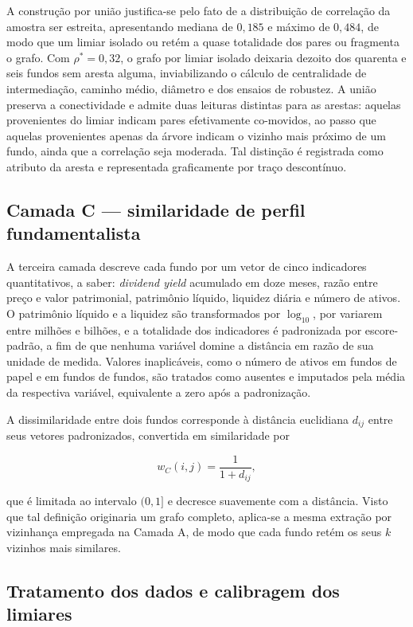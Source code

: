A construção por união justifica-se pelo fato de a distribuição de correlação
da amostra ser estreita, apresentando mediana de $0{,}185$ e máximo de
$0{,}484$, de modo que um limiar isolado ou retém a quase totalidade dos pares
ou fragmenta o grafo. Com $\rho^{*} = 0{,}32$, o grafo por limiar isolado
deixaria dezoito dos quarenta e seis fundos sem aresta alguma, inviabilizando
o cálculo de centralidade de intermediação, caminho médio, diâmetro e dos
ensaios de robustez. A união preserva a conectividade e admite duas leituras
distintas para as arestas: aquelas provenientes do limiar indicam pares
efetivamente co-movidos, ao passo que aquelas provenientes apenas da árvore
indicam o vizinho mais próximo de um fundo, ainda que a correlação seja
moderada. Tal distinção é registrada como atributo da aresta e representada
graficamente por traço descontínuo.

\subsection{Camada C — similaridade de perfil fundamentalista}

A terceira camada descreve cada fundo por um vetor de cinco indicadores
quantitativos, a saber: \textit{dividend yield} acumulado em doze meses, razão
entre preço e valor patrimonial, patrimônio líquido, liquidez diária e número
de ativos. O patrimônio líquido e a liquidez são transformados por
$\log_{10}$, por variarem entre milhões e bilhões, e a totalidade dos
indicadores é padronizada por escore-padrão, a fim de que nenhuma variável
domine a distância em razão de sua unidade de medida. Valores inaplicáveis,
como o número de ativos em fundos de papel e em fundos de fundos, são tratados
como ausentes e imputados pela média da respectiva variável, equivalente a
zero após a padronização.

A dissimilaridade entre dois fundos corresponde à distância euclidiana
$d_{ij}$ entre seus vetores padronizados, convertida em similaridade por

\begin{equation}
  w_C(i,j) = \frac{1}{1 + d_{ij}},
\end{equation}

que é limitada ao intervalo $(0,1]$ e decresce suavemente com a distância.
Visto que tal definição originaria um grafo completo, aplica-se a mesma
extração por vizinhança empregada na Camada A, de modo que cada fundo retém os
seus $k$ vizinhos mais similares.

\subsection{Tratamento dos dados e calibragem dos limiares}


